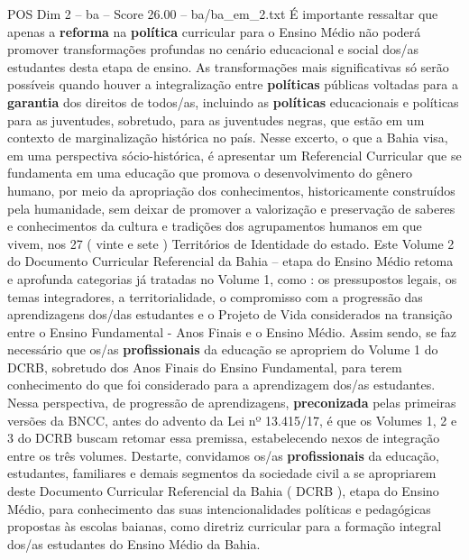 \begin{textsample}{POS Dim 2 – ba – Score 26.00 – ba/ba\_em\_2.txt}
É importante ressaltar que apenas a \textbf{reforma} na \textbf{política} curricular para o Ensino Médio não poderá promover transformações profundas no cenário educacional e social dos/as estudantes desta etapa de ensino.
As transformações mais significativas só serão possíveis quando houver a integralização entre \textbf{políticas} públicas voltadas para a \textbf{garantia} dos direitos de todos/as, incluindo as \textbf{políticas} educacionais e políticas para as juventudes, sobretudo, para as juventudes negras, que estão em um contexto de marginalização histórica no país.
Nesse excerto, o que a Bahia visa, em uma perspectiva sócio-histórica, é apresentar um Referencial Curricular que se fundamenta em uma educação que promova o desenvolvimento do gênero humano, por meio da apropriação dos conhecimentos, historicamente construídos pela humanidade, sem deixar de promover a valorização e preservação de saberes e conhecimentos da cultura e tradições dos agrupamentos humanos em que vivem, nos 27 ( vinte e sete ) Territórios de Identidade do estado.
Este Volume 2 do Documento Curricular Referencial da Bahia – etapa do Ensino Médio retoma e aprofunda categorias já tratadas no Volume 1, como : os pressupostos legais, os temas integradores, a territorialidade, o compromisso com a progressão das aprendizagens dos/das estudantes e o Projeto de Vida considerados na transição entre o Ensino Fundamental - Anos Finais e o Ensino Médio.
Assim sendo, se faz necessário que os/as \textbf{profissionais} da educação se apropriem do Volume 1 do DCRB, sobretudo dos Anos Finais do Ensino Fundamental, para terem conhecimento do que foi considerado para a aprendizagem dos/as estudantes.
Nessa perspectiva, de progressão de aprendizagens, \textbf{preconizada} pelas primeiras versões da BNCC, antes do advento da Lei nº 13.415/17, é que os Volumes 1, 2 e 3 do DCRB buscam retomar essa premissa, estabelecendo nexos de integração entre os três volumes.
Destarte, convidamos os/as \textbf{profissionais} da educação, estudantes, familiares e demais segmentos da sociedade civil a se apropriarem deste Documento Curricular Referencial da Bahia ( DCRB ), etapa do Ensino Médio, para conhecimento das suas intencionalidades políticas e pedagógicas propostas às escolas baianas, como diretriz curricular para a formação integral dos/as estudantes do Ensino Médio da Bahia.

\end{textsample}

